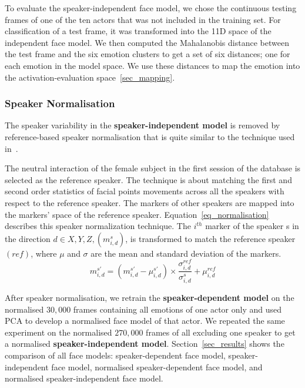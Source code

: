 \documentclass[10pt,journal,cspaper,compsoc]{IEEEtran}
\begin{document}
To evaluate the speaker-independent face model, we chose the continuous testing frames of one of the ten actors that was not included in the training set. For classification of a test frame, it was transformed into the 11D space of the independent face model. We then computed the Mahalanobis distance between the test frame and the six emotion clusters to get a set of six distances; one for each emotion in the model space. We use these distances to map the emotion into the activation-evaluation space~\ref{sec_mapping}.

\subsubsection{Speaker Normalisation}
The speaker variability in the \textbf{speaker-independent model} is removed by reference-based speaker normalisation that is quite similar to the technique used in~\cite{ACTORIZING SPEAKER, LEXICAL AND EMOTIONAL VARIABILITIES OBSERVED IN FACIAL EXPRESSIONS}. 

The neutral interaction of the female subject in the first session of the database is selected as the reference speaker. The technique is about matching the first and second order statistics of facial points movements across all the speakers with respect to the reference speaker. The markers of other speakers are mapped into the markers' space of the reference speaker. Equation~\ref{eq_normalisation} describes this speaker normalization technique. The $i^{th}$ marker of the speaker s in the direction $d \in {X,Y,Z}, (m_{i,d}^{s})$, is transformed to match the reference speaker $(ref)$, where $\mu$ and $\sigma$ are the mean and standard deviation of the markers.
\begin{equation}
m_{i,d}^{s'}=(m_{i,d}^{s'}-\mu_{i,d}^{s'}) \times \frac{\sigma_{i,d}^{ref}}{\sigma_{i,d}^{s}} + \mu_{i,d}^{ref}
\label{eq_normalisation}
\end{equation}


After speaker normalisation, we retrain the \textbf{speaker-dependent model} on the normalised  $30,000$ frames containing all emotions of one actor only and used PCA to develop a normalised face model of that actor. We repeated the same experiment on the normalised $270,000$ frames of all excluding one speaker to get a normalised \textbf{speaker-independent model}. Section~\ref{sec_results} shows the comparison of all face models: speaker-dependent face model, speaker-independent face model, normalised speaker-dependent face model, and normalised speaker-independent face model.
\end{document}
